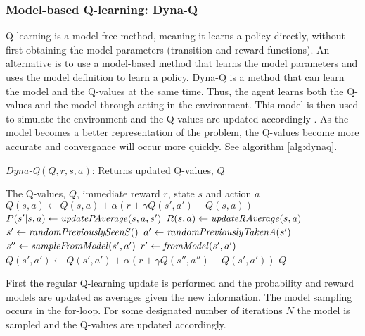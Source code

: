 \subsubsection{Model-based Q-learning: Dyna-Q}
Q-learning is a model-free method, meaning it learns a policy directly, without
first obtaining the model parameters (transition and reward functions). An
alternative is to use a model-based method that learns the model parameters and
uses the model definition to learn a policy.
Dyna-Q is a method that can learn the model and the Q-values at the same time.
Thus, the agent learns both the Q-values and the model through acting in the
environment. This model is then used to simulate the environment and the
Q-values are updated accordingly \cite{rl-rts-1}. As the model becomes a better
representation of the problem, the Q-values become more accurate and
convergance will occur more quickly. See algorithm \ref{alg:dynaq}.
\begin{algorithm}
	\caption{\emph{Dyna-Q}$(Q,r,s,a)$: Returns updated Q-values, $Q$}
	\begin{algorithmic}[1]
	\REQUIRE The Q-values, $Q$, immediate reward $r$, state $s$ and action $a$
	\medskip
	\STATE $Q(s,a) \leftarrow Q(s,a) + \alpha(r + \gamma Q(s',a') - Q(s,a))$
	\STATE $P(s'|s,a) \leftarrow \textrm{\emph{updatePAverage}}(s,a,s')$
	\STATE $R(s,a) \leftarrow \textrm{\emph{updateRAverage}}(s,a)$
		\STATE $s' \leftarrow \textrm{\emph{randomPreviouslySeenS}}()$
		\STATE $a' \leftarrow \textrm{\emph{randomPreviouslyTakenA}}(s')$
		\STATE $s'' \leftarrow \textrm{\emph{sampleFromModel}}(s',a')$
		\STATE $r' \leftarrow \textrm{\emph{fromModel}}(s',a')$
		\STATE $Q(s',a') \leftarrow Q(s',a') + \alpha(r + \gamma Q(s'',a'') - Q(s',a'))$
	\ENDFOR
	\RETURN $Q$
	\end{algorithmic}
\label{alg:dynaq}
\end{algorithm}
First the regular Q-learning update is performed and the probability and reward
models are updated as averages given the new information. The model sampling
occurs in the for-loop. For some designated number of iterations $N$ the model
is sampled and the Q-values are updated accordingly.

